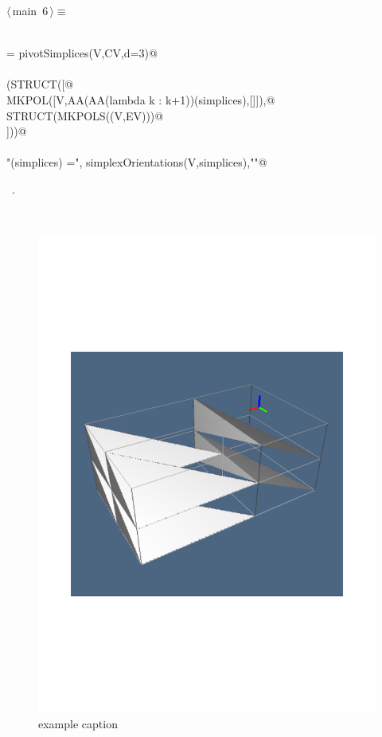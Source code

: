 \documentclass[11pt,oneside]{article}	%
\begin{document}
\begin{flushleft} \small
\begin{minipage}{\linewidth} \label{scrap13}
\protect{}$\langle\,$main\nobreak\ {\footnotesize 6}$\,\rangle\equiv$
\vspace{-1ex}
\begin{list}{}{} \item
\mbox{}\verb@@\\
\mbox{}\verb@simplices = pivotSimplices(V,CV,d=3)@\\
\mbox{}\verb@@\\
\mbox{}\verb@VIEW(STRUCT([@\\
\mbox{}\verb@         MKPOL([V,AA(AA(lambda k : k+1))(simplices),[]]),@\\
\mbox{}\verb@         STRUCT(MKPOLS((V,EV)))@\\
\mbox{}\verb@         ]))@\\
\mbox{}\verb@@\\
\mbox{}\verb@print"\nsimplexOrientations(simplices) =", simplexOrientations(V,simplices),"\n"@\\
\mbox{}\verb@@{\NWsep}
\end{list}
\vspace{-1ex}
\footnotesize\addtolength{\baselineskip}{-1ex}
\begin{list}{}{\setlength{\itemsep}{-\parsep}\setlength{\itemindent}{-\leftmargin}}
\item \NWtxtMacroRefIn\ .
\end{list}
\end{minipage}\\[4ex]
\end{flushleft}


\begin{figure}[htbp] %
   \centering
   \includegraphics[width=0.6\linewidth]{images/fig1} 
   \caption{example caption}
   \label{fig:example}
\end{figure}
\end{document}
